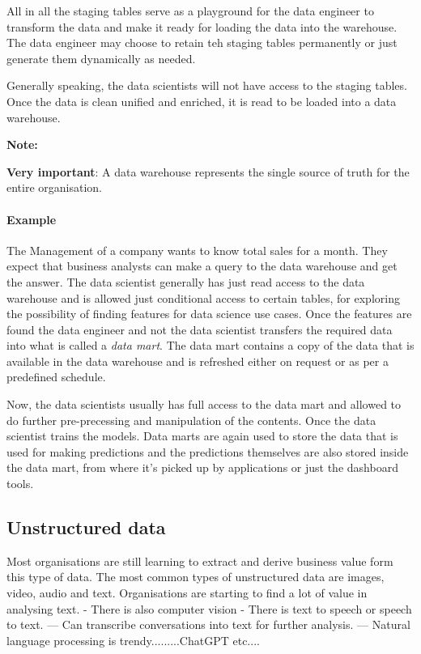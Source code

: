 \documentclass[a4paper, 11pt]{article}
\newenvironment{note}{
    \begin{siderule}
        \textbf{Note: }
        }{
    \end{siderule}}
\begin{document}
    All in all the staging tables serve as a playground for the data engineer to transform the data and make it ready for loading the data into the warehouse.
    The data engineer may choose to retain teh staging tables permanently or just generate them dynamically as needed.

    Generally speaking, the data scientists will not have access to the staging tables.
    Once the data is clean unified and enriched, it is read to be loaded into a data warehouse.

    \begin{note}
        \textbf{Very important}: A data warehouse represents the single source of truth for the entire organisation.
    \end{note}

    \paragraph{Example}
    The Management of a company wants to know total sales for a month.
    They expect that business analysts can make a query to the data warehouse and get the answer.
    The data scientist generally has just read access to the data warehouse and is allowed just conditional access to certain tables, for exploring the possibility of finding features for data science use cases.
    Once the features are found the data engineer and not the data scientist transfers the required data into what is called a \textit{data mart}.
    The data mart contains a copy of the data that is available in the data warehouse and is refreshed either on request or as per a predefined schedule.

    Now, the data scientists usually has full access to the data mart and allowed to do further pre-precessing and manipulation of the contents.
    Once the data scientist trains the models.
    Data marts are again used to store the data that is used for making predictions and the predictions themselves are also stored inside the data mart, from where it's picked up by applications or just the dashboard tools.

    \subsection{Unstructured data}
    Most organisations are still learning to extract and derive business value form this type of data.
    The most common types of unstructured data are images, video, audio and text.
    Organisations are starting to find a lot of value in analysing text.
    - There is also computer vision
    - There is text to speech or speech to text.
    --- Can transcribe conversations into text for further analysis.
    --- Natural language processing is trendy.........ChatGPT etc....
\end{document}

